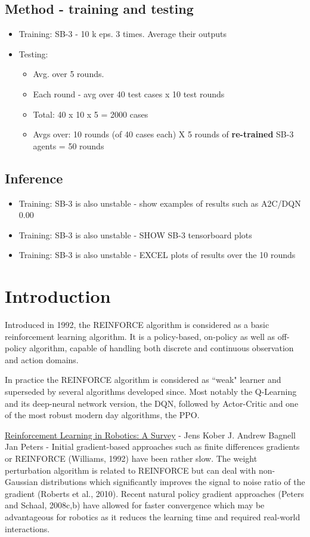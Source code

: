 \documentclass[]{article}
\begin{document}
\subsection{Method - training and testing}

\begin{itemize}
	\item Training: SB-3 - 10 k eps. 3 times. Average their outputs
	\item Testing: 
	\begin{itemize}
		\item Avg. over 5 rounds.
		\item Each round - avg over 40 test cases x 10 test rounds
		\item Total: 40 x 10 x 5 = 2000 cases
		\item Avgs over: 10 rounds (of 40 cases each) X 5 rounds of \textbf{re-trained} SB-3 agents = 50 rounds 
	\end{itemize}
\end{itemize}

\subsection{Inference}
\begin{itemize}
	\item Training: SB-3 is also unstable - show examples of results such as A2C/DQN 0.00 
	\item Training: SB-3 is also unstable - SHOW SB-3 tensorboard plots
	\item Training: SB-3 is also unstable - EXCEL plots of results over the 10 rounds 	
\end{itemize}


\section{Introduction}
Introduced in 1992, the REINFORCE algorithm is considered as a basic reinforcement learning algorithm. It is a policy-based, on-policy as well as off-policy algorithm, capable of handling both discrete and continuous observation and action domains.

In practice the REINFORCE algorithm is considered as ``weak" learner and superseded by several algorithms developed since. Most notably the Q-Learning and its deep-neural network version, the DQN, followed by Actor-Critic and one of the most robust modern day algorithms, the PPO. 

\href{https://www.ri.cmu.edu/pub_files/2013/7/Kober_IJRR_2013.pdf}{Reinforcement Learning in Robotics: A Survey}  - Jens Kober J. Andrew Bagnell Jan Peters -   
Initial gradient-based approaches such as finite differences gradients or REINFORCE
(Williams, 1992) have been rather slow. The weight perturbation algorithm is related to
REINFORCE but can deal with non-Gaussian distributions which significantly improves
the signal to noise ratio of the gradient (Roberts et al., 2010). Recent natural policy
gradient approaches (Peters and Schaal, 2008c,b) have allowed for faster convergence
which may be advantageous for robotics as it reduces the learning time and required
real-world interactions.
\end{document}
